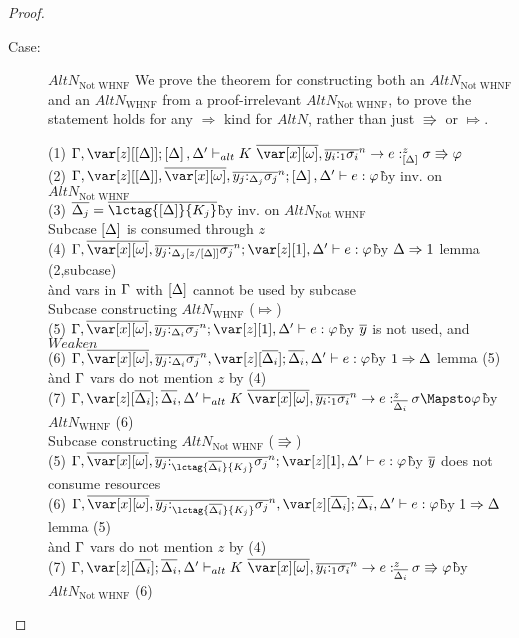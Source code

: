 \begin{proof}
\begin{description}
\item[Case:] $AltN_{\textrm{Not WHNF}}$
    We prove the theorem for constructing both an $AltN_{\textrm{Not WHNF}}$
        and an $AltN_{\textrm{WHNF}}$ from a proof-irrelevant $AltN_{\textrm{Not
        WHNF}}$, to prove the statement holds for any $\Rightarrow$ kind for
        $AltN$, rather than just $\Rrightarrow$ or $\Mapsto$.
\begin{tabbing}
    (1) $\G, \z[\irr{\D}]; \irr{\D}, \D' \vdash_{alt} K~\ov{\xo},\ov{y_i{:}_{1}\s_i}^n\to e :^z_{\irr{\D}} \s \Rrightarrow \vp$\\
    (2) $\G,\z[\irr{\D}],\ov{\xo},\ov{y_j{:}_{\D_j}\s_j}^n; \irr{\D}, \D' \vdash e : \vp$\`by inv. on $AltN_{\textrm{Not WHNF}}$\\
    (3) $\ov{\D_j} = \ov{\lctag{\irr{\D}}{K_j}}$\`by inv. on $AltN_{\textrm{Not WHNF}}$\\
    Subcase $\left[\Delta\right]$ is consumed through $z$\\
    (4) $\G,\ov{\xo},\ov{y_j{:}_{\D_j[z/\irr{\D}]}\s_j}^n; \z[1], \D' \vdash e : \vp$\`by $\Delta \Rightarrow 1$ lemma (2,subcase)\\\`and vars in $\Gamma$ with $\left[\Delta\right]$ cannot be used by subcase\\
    Subcase constructing $AltN_{\textrm{WHNF}}$ ($\Mapsto$)\\
    (5) $\G,\ov{\xo},\ov{y_j{:}_{\D_i}\s_j}^n; \z[1], \D' \vdash e : \vp$\`by $\overline{y}$ is not used, and $Weaken$\\
    (6) $\G,\ov{\xo},\ov{y_j{:}_{\D_i}\s_j}^n, \z[\ov{\D_i}]; \ov{\D_i}, \D' \vdash e : \vp$\`by $1 \Rightarrow \Delta$ lemma (5)\\\` and $\Gamma$ vars do not mention $z$ by (4) \\
    (7) $\G, \z[\ov{\D_i}]; \ov{\D_i}, \D' \vdash_{alt} K~\ov{\xo},\ov{y_i{:}_{1}\s_i}^n \to e :^z_{\ov{\D_i}} \s \Mapsto \vp$\`by $AltN_{\textrm{WHNF}}$ (6)\\
    Subcase constructing $AltN_{\textrm{Not WHNF}}$ ($\Rrightarrow$)\\
    (5) $\G,\ov{\xo},\ov{y_j{:}_{\lctag{\ov{\D_i}}{K_j}}\s_j}^n; \z[1], \D' \vdash e : \vp$\`by $\overline{y}$ does not consume resources\\
    (6) $\G,\ov{\xo},\ov{y_j{:}_{\lctag{\ov{\D_i}}{K_j}}\s_j}^n, \z[\ov{\D_i}]; \ov{\D_i}, \D' \vdash e : \vp$\`by $1 \Rightarrow \Delta$ lemma (5)\\\` and $\Gamma$ vars do not mention $z$ by (4) \\
    (7) $\G, \z[\ov{\D_i}]; \ov{\D_i}, \D' \vdash_{alt} K~\ov{\xo},\ov{y_i{:}_{1}\s_i}^n \to e :^z_{\ov{\D_i}} \s \Rrightarrow \vp$\`by $AltN_{\textrm{Not WHNF}}$ (6)\\

\end{tabbing}
\end{description}
\end{proof}
